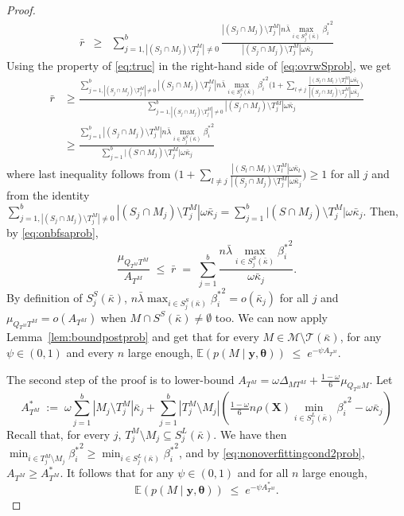 \documentclass[
  12pt]{article}
\newcommand{\E}{\mathbb{E}}
\newcommand{\T}{\mathcal{T}}
\newcommand{\by}{\mathbf{y}}
\newcommand{\btheta}{\boldsymbol{\theta}}
\newcommand{\bX}{\mathbf{X}}
\begin{document}
\begin{proof}
\begin{eqnarray}\label{eq:ovrwSprob}
    \bar{r}
    &\geq &\sum_{j=1,|(S_j\cap M_j )\setminus T^M_j|\neq 0}^b\frac{|(S_j\cap M_j )\setminus T^M_j|n\bar{\lambda}\max_{i\in S^{S}_j(\bar{\kappa})}{\beta_i^*}^2}{|(S_j\cap M_j )\setminus T^M_j|\omega\bar{\kappa}_j}
\end{eqnarray}
Using the property of \eqref{eq:truc} in the right-hand side of \eqref{eq:ovrwSprob}, we get
\begin{align*}
     \bar{r}
    &\geq \frac{\sum_{j=1,|(S_j\cap M_j )\setminus T^M_j|\neq 0 }^b|(S_j\cap M_j )\setminus T^M_j|n\bar{\lambda}\max_{i\in S^{S}_j(\bar{\kappa})}{\beta_i^*}^2\Big(1+\sum_{l\neq j}\frac{|(S_l\cap M_l)\setminus T^M_l|\omega\bar{\kappa}_l}{|(S_j\cap M_j )\setminus T^M_j|\omega\bar{\kappa}_j}\Big)}{\sum_{j=1,|(S_j\cap M_j )\setminus T^M_j|\neq 0}^b|(S_j\cap M_j )\setminus T^M_j|\omega\bar{\kappa}_j} \\
    &\geq \frac{\sum_{j=1}^b|(S_j\cap M_j )\setminus T^M_j|n\bar{\lambda}\max_{i\in S^{S}_j(\bar{\kappa})}{\beta_i^*}^2}{\sum_{j=1}^b \big|(S\cap M_j)\setminus T^M_j\big|\omega\bar{\kappa}_j}
\end{align*}
where last inequality follows from $\Big(1+\sum_{l\neq j}\frac{|(S_l\cap M_l)\setminus T^M_l|\omega\bar{\kappa}_l}{|(S_j\cap M_j )\setminus T^M_j|\omega\bar{\kappa}_j}\Big)\geq 1$ for all $j$ and from the identity $\sum_{j=1,|(S_j\cap M_j )\setminus T^M_j|\neq 0}^b|(S_j\cap M_j )\setminus T^M_j|\omega\bar{\kappa}_j=\sum_{j=1}^b \big|(S\cap M_j)\setminus T^M_j\big|\omega\bar{\kappa}_j$. Then, %
by \eqref{eq:onbfsaprob},
$$\frac{\mu_{Q_{T^M} T^M}}{ A_{T^M}} \;\leq\; \bar{r} \;= \;\sum_{j=1}^b\frac{n\bar{\lambda}\max_{i\in S^{S}_j(\bar{\kappa})}{\beta_i^*}^2}{\omega\bar{\kappa}_j}.$$
By definition of $S_j^{S}(\bar{\kappa})$, $n\bar{\lambda}\max_{i\in S^{S}_j(\bar{\kappa})}{\beta_i^*}^2=o(\bar{\kappa}_j)$ for all $j$ and $\mu_{Q_{T^M} T^M}=o(A_{T^M})$ when $M\cap S^{S}(\bar{\kappa})\neq\emptyset$ too.
We can now apply Lemma~\ref{lem:boundpostprob} and get that for every $M\in \mathcal M\setminus \T(\bar{\kappa})$, for any $\psi\in(0,1)$ and every $n$ large enough, $\E(p(M\mid \by, \btheta))\;\leq\;e^{-\psi A_{T^M}}$.

The second step of the proof is to lower-bound $A_{T^M}=\omega\Delta_{MT^M}+\tfrac{1-\omega}{6}\mu_{Q_{T^M}M}$. %
Let
$$A_{T^M}^*\;:=\;\omega\sum_{j=1}^b|M_j \setminus T^M_j|\bar{\kappa}_j + \sum_{j=1}^b |T^M_j\setminus M_j |\left(\tfrac{1-\omega}{6} n \rho(\bX) \min_{i\in S^{L}_j(\bar{\kappa})}{\beta^*_i}^{2} - \omega\bar{\kappa}_j\right) $$
Recall that, for every $j$, $T^M_j\setminus M_j\subseteq S^{L}_j(\bar{\kappa})$. We have then $\min_{i\in T^M_j\setminus M_j}{\beta^*_i}^{2}\geq \min_{i\in S^{L}_j(\bar{\kappa})}{\beta^*_i}^{2}$, and by \eqref{eq:nonoverfittingcond2prob}, $A_{T^M} \geq A_{T^M}^*$. It follows that for any $\psi\in(0,1)$ and for all $n$ large enough,
\begin{equation}\label{eq:boundexp2prob}
    \E(p(M\mid \by, \btheta))\;\leq\;e^{-\psi A_{T^M}^*}.
\end{equation}


\end{proof}
\end{document}
